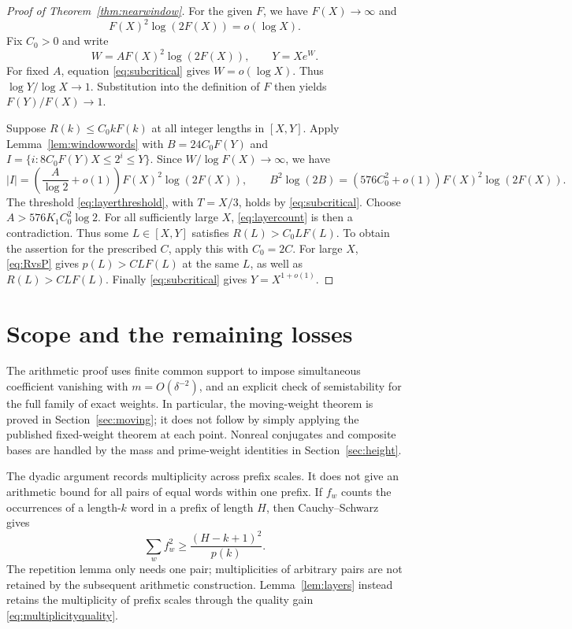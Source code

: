 \documentclass[11pt]{article}
\numberwithin{equation}{section}
\theoremstyle{remark}\newtheorem{remark}[theorem]{Remark}
\begin{document}
\begin{proof}[Proof of Theorem~\ref{thm:nearwindow}]
For the given $F$, we have $F(X)\to\infty$ and
\begin{equation}\label{eq:subcritical}
 F(X)^2\log(2F(X))=o(\log X).
\end{equation}
Fix $C_0>0$ and write
\[
 W=A F(X)^2\log(2F(X)),\qquad Y=Xe^W.
\]
For fixed $A$, equation \eqref{eq:subcritical} gives $W=o(\log X)$.
Thus $\log Y/\log X\to1$. Substitution into the definition of $F$
then yields $F(Y)/F(X)\to1$.

Suppose $R(k)\le C_0kF(k)$ at all integer lengths in $[X,Y]$.
Apply Lemma~\ref{lem:windowwords} with $B=24C_0F(Y)$ and
$I=\{i:8C_0F(Y)X\le2^i\le Y\}$.
Since $W/\log F(X)\to\infty$, we have
\[
 |I|=\left(\frac A{\log2}+o(1)\right)F(X)^2\log(2F(X)),
 \qquad
 B^2\log(2B)=(576C_0^2+o(1))F(X)^2\log(2F(X)).
\]
The threshold \eqref{eq:layerthreshold}, with $T=X/3$, holds by
\eqref{eq:subcritical}. Choose $A>576K_1C_0^2\log2$.
For all sufficiently large $X$, \eqref{eq:layercount} is then a
contradiction. Thus some $L\in[X,Y]$ satisfies $R(L)>C_0LF(L)$.
To obtain the assertion for the prescribed $C$, apply this with
$C_0=2C$. For large $X$, \eqref{eq:RvsP} gives
$p(L)>CLF(L)$ at the same $L$, as well as $R(L)>CLF(L)$.
Finally \eqref{eq:subcritical} gives $Y=X^{1+o(1)}$.
\end{proof}

\section{Scope and the remaining losses}
The arithmetic proof uses finite common support to impose simultaneous
coefficient vanishing with $m=O(\delta^{-2})$, and an explicit check of
semistability for the full family of exact weights. In particular,
the moving-weight theorem is proved in Section~\ref{sec:moving}; it
does not follow by simply applying the published fixed-weight theorem
at each point. Nonreal conjugates and composite bases are handled by
the mass and prime-weight identities in Section~\ref{sec:height}.

The dyadic argument records multiplicity across prefix scales.
It does not give an arithmetic bound for all pairs of equal words
within one prefix. If $f_w$ counts the occurrences of a length-$k$
word in a prefix of length $H$, then Cauchy--Schwarz gives
\[
 \sum_w f_w^2\ge\frac{(H-k+1)^2}{p(k)}.
\]
The repetition lemma only needs one pair; multiplicities of arbitrary
pairs are not retained by the subsequent arithmetic construction.
Lemma~\ref{lem:layers} instead retains the multiplicity of prefix
scales through the quality gain \eqref{eq:multiplicityquality}.
\end{document}
